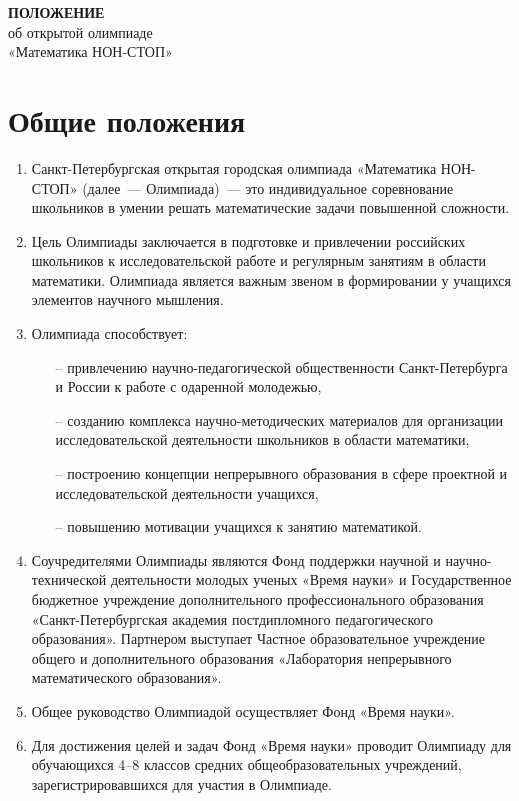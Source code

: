 \documentclass[a4paper,12pt]{article}
\newcommand{\mns}{«Математика НОН-СТОП»\xspace}
\begin{document}


\begin{center} \Large
	{\bf ПОЛОЖЕНИЕ} \\
	об открытой олимпиаде \\
	\mns \\
\end{center}

\section{Общие положения}

\begin{enumerate}
	\item Санкт-Петербургская открытая городская олимпиада «Математика НОН-СТОП» (далее~— Олимпиада)~— это индивидуальное соревнование школьников в умении решать математические задачи повышенной сложности.
	\item Цель Олимпиады заключается в подготовке и привлечении российских школьников к исследовательской работе и регулярным занятиям в области математики. Олимпиада является важным звеном в формировании у учащихся элементов научного мышления.
	\item Олимпиада способствует: \begin{enumerate}
	   \item[–] привлечению научно-педагогической общественности Санкт-Петербурга и России к работе с одаренной молодежью,
	   \item[–] созданию комплекса научно-методических материалов для организации исследовательской деятельности школьников в области математики,
	   \item[–] построению концепции непрерывного образования в сфере проектной и
исследовательской деятельности учащихся,
	   \item[–] повышению мотивации учащихся к занятию математикой.
   \end{enumerate}
	\item Соучредителями Олимпиады являются Фонд поддержки научной и научно-технической деятельности молодых ученых «Время науки» и Государственное бюджетное учреждение дополнительного профессионального образования «Санкт-Петербургская академия постдипломного педагогического образования». Партнером выступает Частное образовательное учреждение общего и дополнительного образования «Лаборатория непрерывного математического образования».
	\item Общее руководство Олимпиадой осуществляет Фонд «Время науки». 
	\item Для достижения целей и задач Фонд «Время науки» проводит Олимпиаду для обучающихся 4–8 классов средних общеобразовательных учреждений, зарегистрировавшихся для участия в Олимпиаде.

\end{enumerate}
\end{document}
